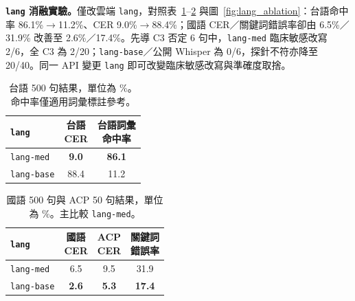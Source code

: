 \documentclass[11pt,a4paper]{article}
\newcommand{\LangMVOne}{\texttt{lang-med}}
\newcommand{\LangLegacy}{\texttt{lang-base}}
\begin{document}
\textbf{\texttt{lang} 消融實驗。}僅改雲端 \texttt{lang}，對照表~\ref{tab:lang_tw}--\ref{tab:lang_man} 與圖~\ref{fig:lang_ablation}：台語命中率 86.1\%$\rightarrow$11.2\%、CER 9.0\%$\rightarrow$88.4\%；國語 CER／關鍵詞錯誤率卻由 6.5\%／31.9\% 改善至 2.6\%／17.4\%。先導 C3 否定 6 句中，\LangMVOne{} 臨床敏感改寫 2/6，全 C3 為 2/20；\LangLegacy{}／公開 Whisper 為 0/6，探針不符亦降至 20/40。同一 API 變更 \texttt{lang} 即可改變臨床敏感改寫與準確度取捨。

\begin{table}[!htbp]
\centering
\footnotesize
\setlength{\tabcolsep}{4pt}
\renewcommand{\arraystretch}{1.05}
\begin{tabular}{@{}lcc@{}}
\toprule
\textbf{\texttt{lang}} & \shortstack{\textbf{台語}\\\textbf{CER}} &
\shortstack{\textbf{台語詞彙}\\\textbf{命中率}} \\
\midrule
\texttt{lang-med} & \textbf{9.0} & \textbf{86.1} \\
\texttt{lang-base} & 88.4 & 11.2 \\
\bottomrule
\end{tabular}
\caption{\label{tab:lang_tw} 台語 500 句結果，單位為 \%。命中率僅適用詞彙標註參考。}
\end{table}

\begin{table}[!htbp]
\centering
\footnotesize
\setlength{\tabcolsep}{3pt}
\renewcommand{\arraystretch}{1.05}
\begin{tabular}{@{}lccc@{}}
\toprule
\textbf{\texttt{lang}} & \shortstack{\textbf{國語}\\\textbf{CER}} &
\shortstack{\textbf{ACP}\\\textbf{CER}} &
\shortstack{\textbf{關鍵詞}\\\textbf{錯誤率}} \\
\midrule
\texttt{lang-med} & 6.5 & 9.5 & 31.9 \\
\texttt{lang-base} & \textbf{2.6} & \textbf{5.3} & \textbf{17.4} \\
\bottomrule
\end{tabular}
\caption{\label{tab:lang_man} 國語 500 句與 ACP 50 句結果，單位為 \%。主比較 \texttt{lang-med}。}
\end{table}
\end{document}
